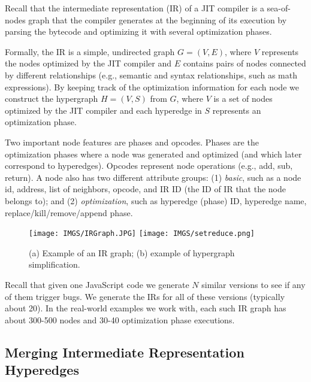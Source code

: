 \documentclass[runningheads]{llncs}
\begin{document}
Recall that the intermediate representation (IR) of a JIT compiler is a sea-of-nodes graph that the compiler generates at the beginning of its execution by parsing the bytecode and optimizing it with several optimization phases.

Formally, the IR is a simple, undirected graph $G = (V, E)$, where $V$ represents the nodes optimized by the JIT compiler and $E$ contains pairs of nodes connected by different relationships (e.g., semantic and syntax relationships, such as math expressions). By keeping track of the optimization information for each node we construct the hypergraph $H = (V, S)$ from $G$, where $V$ is a set of nodes optimized by the JIT compiler and each hyperedge in $S$ represents an optimization phase. 

Two important node features are phases and opcodes. Phases are the optimization phases where a node was generated and optimized (and which later correspond to hyperedges). Opcodes represent node operations (e.g., add, sub, return). A node also has two different attribute groups: (1) \textit{basic}, such as a node id, address, list of neighbors, opcode, and IR ID (the ID of IR that the node belongs to); and (2) \textit{optimization}, such as hyperedge (phase) ID, hyperedge name, replace/kill/remove/append phase.

\begin{figure}[t]
    \begin{center}
    \vspace{-.5cm}
    \texttt{[image: IMGS/IRGraph.JPG]}
    \texttt{[image: IMGS/setreduce.png]}
    \vspace{-.8cm}
    \end{center}
    \caption{(a) Example of an IR graph; (b) example of hypergraph simplification.}
    \label{fig:irgraph_set_merge}
\end{figure}

Recall that given one JavaScript code we generate $N$ similar versions to see if any of them trigger bugs. We generate the IRs for all of these versions (typically about 20). In the real-world examples we work with, each such IR graph has about 300-500 nodes and 30-40 optimization phase executions.
%
\subsection{Merging Intermediate Representation Hyperedges}\label{sec:graph_mege}
\end{document}

